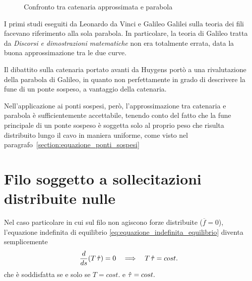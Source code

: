 \begin{figure}
  \centering
  
  \caption{Confronto tra catenaria approssimata e parabola}
  \label{fig:confronto_catenaria_parabola}
   
  
 \end{figure}
 
I primi studi eseguiti da Leonardo da Vinci e Galileo Galilei sulla teoria dei fili  facevano riferimento alla sola parabola. In particolare, la teoria di Galileo tratta da \emph{Discorsi e dimostrazioni matematiche} non era totalmente errata, data la buona approssimazione tra le due curve.

Il dibattito sulla catenaria portato avanti da Huygens portò a una rivalutazione della parabola di Galileo, in quanto non perfettamente in grado di descrivere  la fune di un ponte sospeso, a vantaggio della catenaria.

Nell'applicazione ai ponti sospesi, però, l'approssimazione tra catenaria e parabola è sufficientemente accettabile, tenendo conto del fatto che la fune principale di un ponte sospeso è soggetta solo al proprio peso che risulta distribuito lungo il cavo in maniera uniforme, come visto nel paragrafo~\ref{section:equazione_ponti_sospesi}

 
\section{Filo soggetto a sollecitazioni distribuite nulle}
Nel caso particolare in cui sul filo non agiscono forze distribuite ($\overline{f}=0$), l'equazione indefinita di equilibrio \eqref{eq:equazione_indefinita_equilibrio} diventa semplicemente
\[
 \dfrac{d}{ds}(T\,\hat{\tau})= 0 \quad \Longrightarrow\quad T\,\hat{\tau} = cost.
\]
che è soddisfatta se e solo se $T=cost.$ e $\hat{\tau} = cost.$

